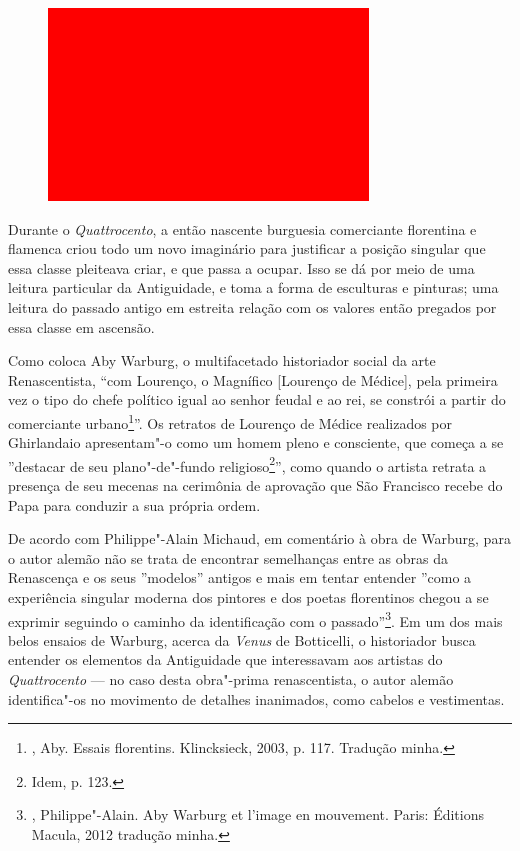 \begin{figure}[!ht]
\centering
 \includegraphics[width=85mm]{./imgs/im1.jpg}
\caption{\footnotesize{}}
\end{figure}

\asterisc

Durante o \emph{Quattrocento}, a então nascente burguesia comerciante
florentina e flamenca criou todo um novo imaginário para justificar a
posição singular que essa classe pleiteava criar, e que passa a ocupar.
Isso se dá por meio de uma leitura particular da Antiguidade, e toma a
forma de esculturas e pinturas; uma leitura do passado antigo em
estreita relação com os valores então pregados por essa classe em
ascensão.

Como coloca Aby Warburg, o multifacetado historiador social da arte
Renascentista, ``com Lourenço, o Magnífico {[}Lourenço de
Médice{]}, pela primeira vez o tipo do chefe político igual ao senhor
feudal e ao rei, se constrói a partir do comerciante urbano\footnote{,
  Aby. Essais florentins. Klincksieck, 2003, p. 117. Tradução minha.}''.
Os retratos de Lourenço de Médice realizados por Ghirlandaio
apresentam"-o como um homem pleno e consciente, que começa a se
''destacar de seu plano"-de"-fundo religioso\footnote{Idem, p. 123.}'',
como quando o artista retrata a presença de seu mecenas na cerimônia de
aprovação que São Francisco recebe do Papa para conduzir a sua própria
ordem.

De acordo com Philippe"-Alain Michaud, em comentário à obra de Warburg,
para o autor alemão não se trata de encontrar semelhanças entre as obras
da Renascença e os seus ''modelos'' antigos e mais em tentar entender
''como a experiência singular moderna dos pintores e dos poetas
florentinos chegou a se exprimir seguindo o caminho da identificação com
o passado''\footnote{, Philippe"-Alain. Aby
  Warburg et l'image en mouvement. Paris: Éditions Macula, 2012 tradução
  minha.}. Em um dos mais belos ensaios de Warburg, acerca da
\emph{Venus} de Botticelli, o historiador busca entender os elementos da
Antiguidade que interessavam aos artistas do \emph{Quattrocento} --- no
caso desta obra"-prima renascentista, o autor alemão identifica"-os no
movimento de detalhes inanimados, como cabelos e vestimentas.

